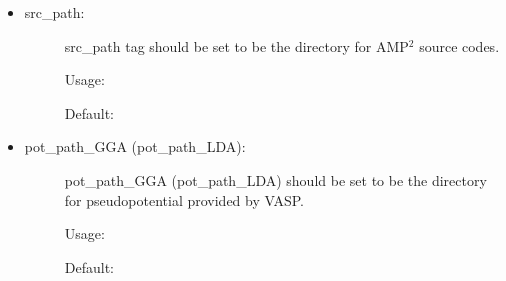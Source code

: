 \documentclass[letterpaper,10pt,english]{sphinxmanual}
\begin{document}
\begin{itemize}
\begin{description}
\end{description}

\item {} \begin{description}
\item[{src\_path:}] \leavevmode
src\_path tag should be set to be the directory for AMP$^{\text{2}}$ source codes.

Usage:

\begin{sphinxVerbatim}[commandchars=\\\{\}]
   \PYG{p}{[}  \PYG{p}{]}
\end{sphinxVerbatim}

Default:

\begin{sphinxVerbatim}[commandchars=\\\{\}]
   
\end{sphinxVerbatim}

\end{description}

\item {} \begin{description}
\item[{pot\_path\_GGA (pot\_path\_LDA):}] \leavevmode
pot\_path\_GGA (pot\_path\_LDA) should be set to be the directory for pseudopotential provided by VASP.

Usage:

\begin{sphinxVerbatim}[commandchars=\\\{\}]
   \PYG{p}{[}  \PYG{p}{]}
   \PYG{p}{[}  \PYG{p}{]}
\end{sphinxVerbatim}

Default:

\begin{sphinxVerbatim}[commandchars=\\\{\}]
   
   
\end{sphinxVerbatim}

\end{description}

\end{itemize}
\end{document}
